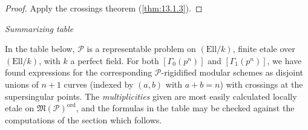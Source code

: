 \begin{proof}
Apply the crossings theorem (\ref{thm:13.1.3}).
\end{proof}

\kmitem\label{item:13.5.6}\emph{Summarizing table}\par
In the table below, $\mathcal{P}$ is a representable problem on $(\mathrm{Ell}/k)$, finite etale over $(\mathrm{Ell}/k)$, with $k$ a perfect field. For both $[\Gamma_0(p^n)]$ and $[\Gamma_1(p^n)]$, we have found expressions for the corresponding $\mathcal{P}$-rigidified modular schemes as disjoint unions of $n+1$ curves (indexed by $(a,b)$ with $a + b = n$) with crossings at the supersingular points. The \emph{multiplicities} given are most easily calculated locally etale on $\mathfrak{M}(\mathcal{P})^{\mathrm{ord}}$, and the formulas in the table may be checked against the computations of the section which follows.

